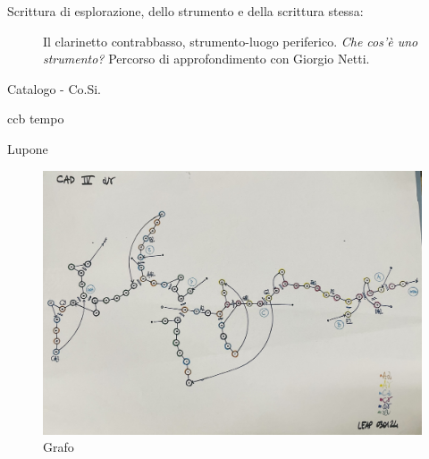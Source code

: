 \documentclass{gs-adonis}
\begin{document}
\begin{description}
  \item[Scrittura di esplorazione, dello strumento e della scrittura stessa:]
  Il clarinetto contrabbasso, strumento-luogo periferico.
  \emph{Che cos'è uno strumento?} Percorso di approfondimento con Giorgio Netti.
\end{description}

\begin{description}
  \item[Catalogo - Co.Si.]
\end{description}

\begin{description}
  \item[ccb tempo]
\end{description}

\begin{description}
  \item[Lupone]
\end{description}





\begin{figure}[ht]
  \centering
  \includegraphics[width=\linewidth]{images/cad-IV-grafo.jpg}
  \captionsetup{width=.81\linewidth}
  \caption{Grafo}
  \label{grafo}
\end{figure}
\end{document}
